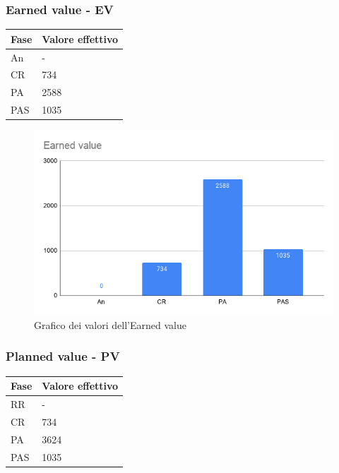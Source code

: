 \subsubsection{Earned value - EV}

\begin{longtabu} to \textwidth {| X[0.1,c m] | X[0.1,c m] |}
    \hline
    \textbf{Fase} &
    \textbf{Valore effettivo} \\
    \hline
    An & -  \\ 
    \hline
    CR & 734 \\
    \hline
    PA & 2588 \\
    \hline
    PAS & 1035 \\
    \hline 
    \end{longtabu}

    \begin{figure}[H]
        \centering
        \includegraphics[width=10 cm]{source/sections/images/Earned_value.png}
        \caption{Grafico dei valori dell'Earned value}
    \end{figure}

\subsubsection{Planned value - PV}

\begin{longtabu} to \textwidth {| X[0.1,c m] | X[0.1,c m] | }
    \hline
    \textbf{Fase} &
    \textbf{Valore effettivo} \\
    \hline
    RR & - \\
    \hline
    CR & 734 \\
    \hline
    PA & 3624 \\
    \hline
    PAS & 1035 \\
    \hline 
    \end{longtabu}

